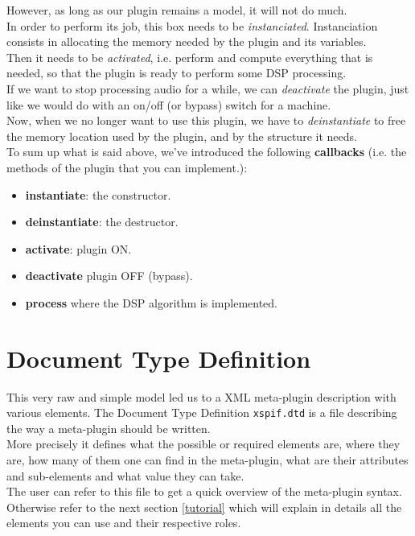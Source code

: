 \noindent However, as long as our plugin remains a model, it will not do much.\\
\noindent In order to perform its job, this box needs to be \emph{instanciated}. Instanciation consists in allocating the memory needed by the plugin and its variables.\\
\noindent Then it needs to be \emph{activated}, i.e. perform and
compute everything that is needed, so that the plugin is ready to perform some DSP processing.\\
\noindent If we want to stop processing audio for a while, we can
\emph{deactivate} the plugin, just like we would do with an on/off (or
bypass) switch for a machine.\\
\noindent Now, when we no longer want to use this plugin, we have to
\emph{deinstantiate} to free the memory location used by the plugin,
and by the structure it needs.\\
\noindent To sum up what is said above, we've introduced the
following \textbf{callbacks} (i.e. the methods of the plugin that you
can implement.):
\begin{itemize}
\item \textbf{instantiate}: the constructor.
\item \textbf{deinstantiate}: the destructor.
\item \textbf{activate}: plugin ON.
\item \textbf{deactivate} plugin OFF (bypass).
\item \textbf{process} where the DSP algorithm is implemented.
\end{itemize}

\section{Document Type Definition}

\noindent This very raw and simple model led us to a XML meta-plugin description 
with various elements. The Document Type Definition \verb|xspif.dtd| is a file 
describing the way a meta-plugin should be written.\\
\noindent More precisely it defines what the possible or required
elements are, where they are, how many of them one can find in the
meta-plugin, what are their attributes and sub-elements and what value
they can take.\\ 
\noindent The user can refer to this file to get a quick overview of
the meta-plugin syntax. Otherwise refer to the next section \ref{tutorial} which will explain in details all the elements you can use and their respective roles.  

